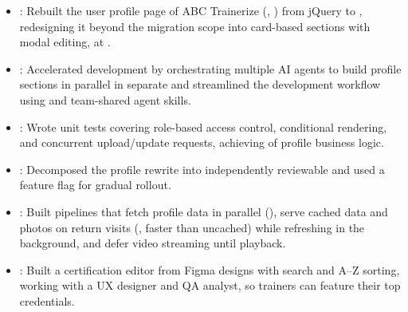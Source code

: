 \begin{itemize}
  \item {}: Rebuilt the user profile page of ABC Trainerize (, ) from jQuery to , redesigning it beyond the migration scope into card-based sections with modal editing, at .
  \item {}: Accelerated development by orchestrating multiple AI agents to build profile sections in parallel in separate  and streamlined the development workflow using  and team-shared agent skills.
  \item {}: Wrote  unit tests covering role-based access control, conditional rendering, and concurrent upload/update requests, achieving  of profile business logic.
  \item {}: Decomposed the profile rewrite into independently reviewable  and used a  feature flag for gradual rollout.
  \item {}: Built  pipelines that fetch profile data in parallel (), serve cached data and photos on return visits (, \resumeEmphasis{2.4\ensuremath{\times}} faster than uncached) while refreshing in the background, and defer video streaming until playback.
  \item {}: Built a  certification editor from Figma designs with search and A--Z sorting, working with a UX designer and QA analyst, so trainers can feature their top credentials.
\end{itemize}
